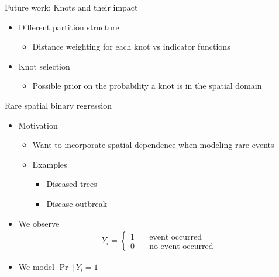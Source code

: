 \documentclass{beamer}
\begin{document}
\begin{frame}{Future work: Knots and their impact}
  \begin{itemize} \setlength{\itemsep}{0.5em}
    \item Different partition structure
    \begin{itemize}
      \item Distance weighting for each knot vs indicator functions
    \end{itemize}
    \item Knot selection
    \begin{itemize}
      \item Possible prior on the probability a knot is in the spatial domain
    \end{itemize}
  \end{itemize}
\end{frame}

\begin{frame}{Rare spatial binary regression}
  \begin{itemize} \setlength{\itemsep}{0.5em}
    \item Motivation
    \begin{itemize}
      \item Want to incorporate spatial dependence when modeling rare events
      \item Examples
      \begin{itemize}
        \item Diseased trees
        \item Disease outbreak
      \end{itemize}
    \end{itemize}
    \item We observe
    \begin{align*}
      Y_i = \left\{ \begin{array}{ll}
        1 \quad & \text{event occurred}\\
        0 \quad & \text{no event occurred}
      \end{array} \right.
    \end{align*}
    \item We model $\Pr[Y_i = 1]$
  \end{itemize}
\end{frame}
\end{document}
